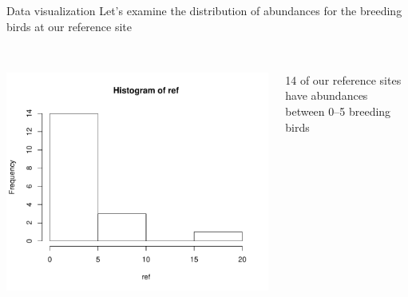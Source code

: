 \documentclass[xcolor=svgnames]{beamer}
\begin{document}
\begin{frame}[fragile]{Data visualization}
Let's examine the distribution of abundances for the breeding birds at our reference site\\~\\
\begin{columns}
\begin{column}{0.6\textwidth}
\begin{Schunk}
\end{Schunk}
\begin{center}
\includegraphics[width=\textwidth,trim=0in 0in 0.3in 0.3in]{R_for_data_analysis-hist_ref.pdf}
\end{center}
\end{column}
\begin{column}{0.4\textwidth}
14 of our reference sites have abundances between 0--5 breeding birds
\end{column}
\end{columns}
\end{frame}
\end{document}
